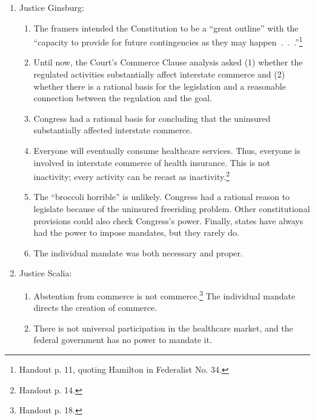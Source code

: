 \begin{enumerate}
\begin{enumerate}
\begin{enumerate}
            proper.
        \end{enumerate}
        \item Taxing power:
        \begin{enumerate}
            \item The individual mandate is valid under Congress's taxing 
            power. ``~.~.~.~it makes going without insurance just another 
            thing the government taxes.''\footnote{Handout p. 10.}
        \end{enumerate}
    \end{enumerate}
    \item Justice Ginsburg:
    \begin{enumerate}
        \item The framers intended the Constitution to be a ``great outline'' 
        with the ``capacity to provide for future contingencies as they may 
        happen~.~.~.''\footnote{Handout p. 11, quoting Hamilton in Federalist 
        No. 34.}
        \item Until now, the Court's Commerce Clause analysis asked (1) 
        whether the regulated activities substantially affect interstate 
        commerce and (2) whether there is a rational basis for the legislation 
        and a reasonable connection between the regulation and the goal.
        \item Congress had a rational basis for concluding that the uninsured 
        substantially affected interstate commerce.
        \item Everyone will eventually consume healthcare services. Thus, 
        everyone is involved in interstate commerce of health insurance. This 
        is not inactivity; every activity can be recast as 
        inactivity.\footnote{Handout p. 14.}
        \item The ``broccoli horrible'' is unlikely. Congress had a rational 
        reason to legislate because of the uninsured freeriding problem. Other 
        constitutional provisions could also check Congress's power. Finally, 
        states have always had the power to impose mandates, but they rarely 
        do.
        \item The individual mandate was both necessary and proper.
    \end{enumerate}
    \item Justice Scalia:
    \begin{enumerate}
        \item Abstention from commerce is not commerce.\footnote{Handout p. 
        18.} The individual mandate directs the creation of commerce.
        \item There is not universal participation in the healthcare market, 
        and the federal government has no power to mandate it.
    \end{enumerate}
\end{enumerate}

